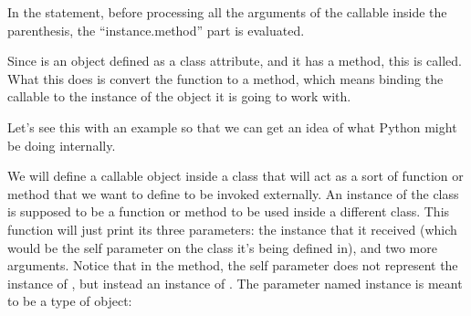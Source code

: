 \documentclass[a4paper,10pt,english]{sphinxmanual}
\begin{document}
In the  statement, before processing all the arguments of the
callable inside the parenthesis, the “instance.method” part is evaluated.

Since  is an object defined as a class attribute, and it has a  method, this is
called. What this does is convert the function to a method, which means binding the
callable to the instance of the object it is going to work with.

Let’s see this with an example so that we can get an idea of what Python might be doing
internally.

We will define a callable object inside a class that will act as a sort of function or method
that we want to define to be invoked externally. An instance of the  class is
supposed to be a function or method to be used inside a different class. This function will
just print its three parameters: the instance that it received (which would be the
self parameter on the class it’s being defined in), and two more arguments. Notice that in
the  method, the self parameter does not represent the instance of
, but instead an instance of . The parameter named instance is meant to
be a  type of object:

\begin{sphinxVerbatim}[commandchars=\\\{\}]
 
      
          

        

 
      
\end{sphinxVerbatim}
\end{document}
